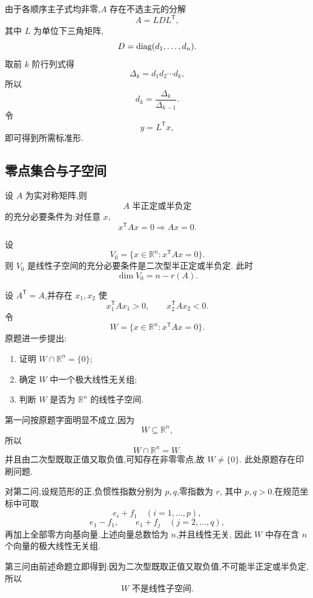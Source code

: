 \begin{solution}
由于各顺序主子式均非零,$A$ 存在不选主元的分解
\[
A=LDL^{\mathsf T},
\]
其中 $L$ 为单位下三角矩阵,
\[
D=\operatorname{diag}(d_1,\ldots,d_n).
\]
取前 $k$ 阶行列式得
\[
\Delta_k=d_1d_2\cdots d_k,
\]
所以
\[
d_k=\dfrac{\Delta_k}{\Delta_{k-1}}.
\]
令
\[
y=L^{\mathsf T}x,
\]
即可得到所需标准形.
\end{solution}


\subsection{零点集合与子空间}

\begin{lemma}[\markstar]
设 $A$ 为实对称矩阵,则
\[
A\text{ 半正定或半负定}
\]
的充分必要条件为:对任意 $x$,
\[
x^{\mathsf T}Ax=0
\Longrightarrow
Ax=0.
\]
\end{lemma}

\begin{proposition}[\markstar]
设
\[
V_0=\{x\in\mathbb{R}^n:x^{\mathsf T}Ax=0\}.
\]
则 $V_0$ 是线性子空间的充分必要条件是二次型半正定或半负定.
此时
\[
\dim V_0=n-r(A).
\]
\end{proposition}


\begin{example}
设 $A^{\mathsf T}=A$,并存在 $x_1,x_2$ 使
\[
x_1^{\mathsf T}Ax_1>0,
\qquad
x_2^{\mathsf T}Ax_2<0.
\]
令
\[
W=\{x\in\mathbb{R}^n:x^{\mathsf T}Ax=0\}.
\]
原题进一步提出:
\begin{enumerate}
    \item 证明 $W\cap\mathbb{R}^n=\{0\}$;
    \item 确定 $W$ 中一个极大线性无关组;
    \item 判断 $W$ 是否为 $\mathbb{R}^n$ 的线性子空间.
\end{enumerate}
\end{example}
\exampleblank

\begin{solution}
第一问按原题字面明显不成立,因为
\[
W\subseteq\mathbb{R}^n,
\]
所以
\[
W\cap\mathbb{R}^n=W.
\]
并且由二次型既取正值又取负值,可知存在非零零点,故 $W\neq\{0\}$.
此处原题存在印刷问题.

对第二问,设规范形的正,负惯性指数分别为 $p,q$,零指数为 $r$,
其中 $p,q>0$.在规范坐标中可取
\[
e_i+f_1\quad(i=1,\ldots,p),
\]
\[
e_1-f_1,\qquad e_1+f_j\quad(j=2,\ldots,q),
\]
再加上全部零方向基向量.上述向量总数恰为 $n$,并且线性无关,
因此 $W$ 中存在含 $n$ 个向量的极大线性无关组.

第三问由前述命题立即得到:因为二次型既取正值又取负值,不可能半正定或半负定,
所以
\[
\boxed{W\text{ 不是线性子空间}.}
\]
\end{solution}


